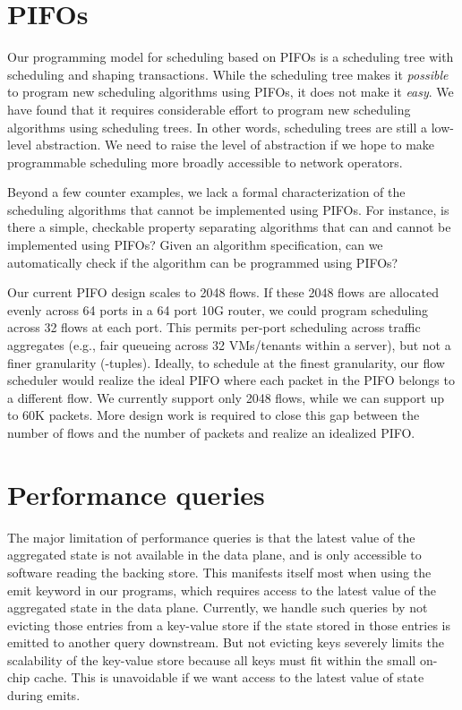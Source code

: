 \section{PIFOs}
\label{sec:pifo_limitations}

Our programming model for scheduling based on PIFOs is a scheduling tree with
scheduling and shaping transactions. While the scheduling tree makes it
\textit{possible} to program new scheduling algorithms using PIFOs, it does not
make it \textit{easy}. We have found that it requires considerable effort to
program new scheduling algorithms using scheduling trees.  In other words,
scheduling trees are still a low-level abstraction. We need to raise the level
of abstraction if we hope to make programmable scheduling more broadly
accessible to network operators.

Beyond a few counter examples, we lack a formal characterization of the
scheduling algorithms that cannot be implemented using PIFOs. For instance, is
there a simple, checkable property separating algorithms that can and cannot be
implemented using PIFOs? Given an algorithm specification, can we automatically
check if the algorithm can be programmed using PIFOs?

Our current PIFO design scales to 2048 flows. If these 2048 flows are allocated
evenly across 64 ports in a 64 port 10G router, we could program scheduling
across 32 flows at each port. This permits per-port scheduling across traffic
aggregates (e.g., fair queueing across 32 VMs/tenants within a server), but not
a finer granularity (-tuples). Ideally, to schedule at the finest
granularity, our flow scheduler would realize the ideal PIFO where each packet
in the PIFO belongs to a different flow. We currently support only 2048 flows,
while we can support up to 60K packets.  More design work is required to close
this gap between the number of flows and the number of packets and realize an
idealized PIFO.


\section{Performance queries}
\label{sec:pq_limitations}

The major limitation of performance queries is that the latest value of the
aggregated state is not available in the data plane, and is only accessible to
software reading the backing store. This manifests itself most when using the
emit keyword in our programs, which requires access to the latest value of the
aggregated state in the data plane. Currently, we handle such queries by not
evicting those entries from a key-value store if the state stored in those
entries is emitted to another query downstream. But not evicting keys severely
limits the scalability of the key-value store because all keys must fit within
the small on-chip cache. This is unavoidable if we want access to the latest
value of state during emits.

